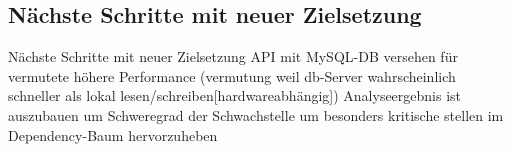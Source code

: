 \subsection{Nächste Schritte mit neuer Zielsetzung} \label{subsec:Nächste_Schritte}
Nächste Schritte mit neuer Zielsetzung
    API mit MySQL-DB versehen für vermutete höhere Performance (vermutung weil db-Server wahrscheinlich schneller als lokal lesen/schreiben[hardwareabhängig])
    Analyseergebnis ist auszubauen um Schweregrad der Schwachstelle um besonders kritische stellen im Dependency-Baum hervorzuheben